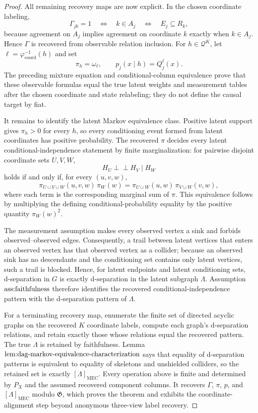 \documentclass{article}
\begin{document}
\begin{proof}
All remaining recovery maps are now explicit.  In the chosen coordinate labeling,
\[
 \Gamma_{jk}=1
 \quad\Longleftrightarrow\quad
 k\in A_j
 \quad\Longleftrightarrow\quad
 E_j\subseteq R_k,
\]
because agreement on \(A_j\) implies agreement on coordinate \(k\) exactly when \(k\in A_j\).  Hence \(\Gamma\) is recovered from observable relation inclusion.  For \(h\in\mathcal Q^K\), let \(\ell=\varphi_{\mathrm{coord}}^{-1}(h)\) and set
\[
 \pi_h=\omega_\ell,
 \qquad
 p_j(x\mid h)=Q_j^\ell(x).
\]
The preceding mixture equation and conditional-column equivalence prove that these observable formulas equal the true latent weights and measurement tables after the chosen coordinate and state relabeling; they do not define the causal target by fiat.

It remains to identify the latent Markov equivalence class.  Positive latent support gives \(\pi_h>0\) for every \(h\), so every conditioning event formed from latent coordinates has positive probability.  The recovered \(\pi\) decides every latent conditional-independence statement by finite marginalization: for pairwise disjoint coordinate sets \(U,V,W\),
\[
 H_U\mathbin{\perp\!\!\!\perp}H_V\mid H_W
\]
holds if and only if, for every \((u,v,w)\),
\[
 \pi_{U\cup V\cup W}(u,v,w)\,\pi_W(w)
 =\pi_{U\cup W}(u,w)\,\pi_{V\cup W}(v,w),
\]
where each term is the corresponding marginal sum of \(\pi\).  This equivalence follows by multiplying the defining conditional-probability equality by the positive quantity \(\pi_W(w)^2\).

The measurement assumption makes every observed vertex a sink and forbids observed--observed edges.  Consequently, a trail between latent vertices that enters an observed vertex has that observed vertex as a collider; because an observed sink has no descendants and the conditioning set contains only latent vertices, such a trail is blocked.  Hence, for latent endpoints and latent conditioning sets, d-separation in \(G\) is exactly d-separation in the latent subgraph \(\Lambda\).  Assumption~\(\textnormal{ass:faithfulness}\) therefore identifies the recovered conditional-independence pattern with the d-separation pattern of \(\Lambda\).

For a terminating recovery map, enumerate the finite set of directed acyclic graphs on the recovered \(K\) coordinate labels, compute each graph's d-separation relations, and retain exactly those whose relations equal the recovered pattern.  The true \(\Lambda\) is retained by faithfulness.  Lemma~\(\textnormal{lem:dag-markov-equivalence-characterization}\) says that equality of d-separation patterns is equivalent to equality of skeletons and unshielded colliders, so the retained set is exactly \([\Lambda]_{\mathrm{MEC}}\).  Every operation above is finite and determined by \(P_X\) and the assumed recovered component columns.  It recovers \(\Gamma\), \(\pi\), \(p\), and \([\Lambda]_{\mathrm{MEC}}\) modulo \(\mathfrak G\), which proves the theorem and exhibits the coordinate-alignment step beyond anonymous three-view label recovery.
\end{proof}
\end{document}

